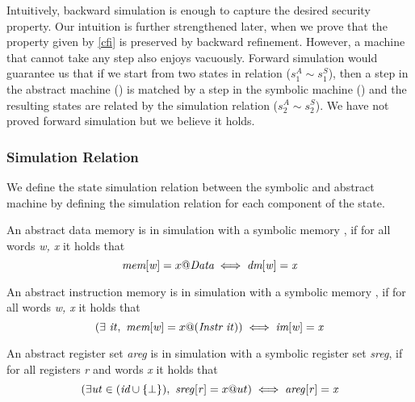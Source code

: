 Intuitively, backward simulation is enough to capture the desired
security property. Our intuition is further strengthened later, when
we prove that the \CFI property given by \cref{cfi} is preserved by
backward refinement. However, a machine that cannot take any step
also enjoys \CFI vacuously. Forward simulation would guarantee us that
if we start from two states in relation ($s^A_1 \sim s_1^S$), then a
step in the abstract machine () is matched by a
step in the symbolic machine () and the resulting
states are related by the simulation relation ($s^A_2 \sim s^S_2$). We
have not proved forward simulation but we believe it holds.


\subsubsection{Simulation Relation}
\label{sec:sim_relation}

We define the state simulation relation between the symbolic and
abstract machine by defining the simulation relation for each
component of the state.

\begin{definition}\label{refine_dmemory}
  An abstract data memory \dmem is in simulation with a
  symbolic memory \mem, if for all words \textit{w, x} it holds
  that 
  $$\textit{mem}[\mathit{w}] = x@\textit{Data}
  \iff \textit{dm}[\mathit{w}] = \mathit{x}$$
\end{definition}

\begin{definition}
  \label{refine_imemory}
  An abstract instruction memory \imem is in simulation with a
  symbolic memory \mem, if for all words \textit{w, x} it holds
  that
  $$(\exists~\mathit{it}, ~ \textit{mem}[\mathit{w}] = 
  x@(\textit{Instr}~\mathit{it}))
  \iff \textit{im}[\mathit{w}] = \mathit{x}$$
\end{definition}

\begin{definition}
  \label{refine_registers}
  An abstract register set \textit{areg} is in simulation with a
  symbolic register set \textit{sreg}, if for all registers \textit{r} and words
  \textit{x} it holds that
  $$(\exists\mathit{ut \in (\textit{id} \cup \lbrace \bot \rbrace)}, 
  ~ \mathit{sreg}[\mathit{r}] = 
  x@ut)
  \iff \mathit{areg}[\mathit{r}] = \mathit{x}$$
\end{definition}

